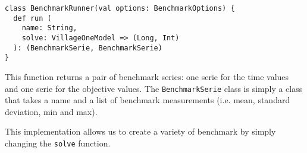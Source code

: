 \documentclass[../thesis.tex]{subfiles}
\begin{document}
\begin{lstlisting}[style=scalaStyle,label={benchmark:run},caption={Benchmark run function},captionpos=b]
class BenchmarkRunner(val options: BenchmarkOptions) {
  def run (
    name: String, 
    solve: VillageOneModel => (Long, Int)
  ): (BenchmarkSerie, BenchmarkSerie)
}
\end{lstlisting}

This function returns a pair of benchmark series: one serie for the time values and one serie for the objective values.
The \texttt{BenchmarkSerie} class is simply a class that takes a name and a list of benchmark measurements (i.e. mean, standard deviation, min and max).

This implementation allows us to create a variety of benchmark by simply changing the \texttt{solve} function.
\end{document}
